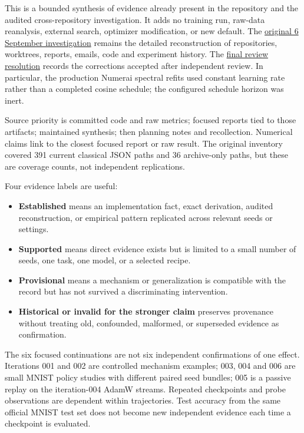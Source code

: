 \documentclass[
  british,
  10pt,
  a4paper,
]{article}
\providecommand{\tightlist}{%
  \setlength{\itemsep}{0pt}\setlength{\parskip}{0pt}}
\begin{document}
This is a bounded synthesis of evidence already present in the
repository and the audited cross-\allowbreak{}repository
investigatio\allowbreak{}n.\allowbreak{} It adds no training run,
raw-data reanalysis,\allowbreak{} external search, optimizer
modification\allowbreak{},\allowbreak{} or new default. The
\href{../../../research/spectral_optimizer_investigation_2026-09-06.md}{original
6 September investigation} remains the detailed reconstruction of
repositories\allowbreak{},\allowbreak{} worktrees, reports, emails, code
and experiment history. The \href{../audit/final-resolution.md}{final
review resolution} records the corrections accepted after independent
review. In particular,\allowbreak{} the production Numerai spectral
refits used constant learning rate rather than a completed cosine
schedule; the configured schedule horizon was inert.

Source priority is committed code and raw metrics; focused reports tied
to those artifacts; maintained synthesis; then planning notes and
recollection\allowbreak{}.\allowbreak{} Numerical claims link to the
closest focused report or raw result. The original inventory covered 391
current classical JSON paths and 36 archive-\allowbreak{}only paths, but
these are coverage counts, not independent
replications\allowbreak{}.\allowbreak{}

Four evidence labels are useful:

\begin{itemize}
\tightlist
\item
  \textbf{Established} means an implementation fact, exact
  derivation,\allowbreak{} audited
  reconstructi\allowbreak{}on,\allowbreak{} or empirical pattern
  replicated across relevant seeds or settings.
\item
  \textbf{Supported} means direct evidence exists but is limited to a
  small number of seeds, one task, one model, or a selected recipe.
\item
  \textbf{Provisional} means a mechanism or generalization is compatible
  with the record but has not survived a discriminating
  intervention\allowbreak{}.\allowbreak{}
\item
  \textbf{Historical or invalid for the stronger claim} preserves
  provenance without treating old, confounded,\allowbreak{} malformed,
  or superseded evidence as confirmation\allowbreak{}.\allowbreak{}
\end{itemize}

The six focused continuations are not six independent confirmations of
one effect. Iterations 001 and 002 are controlled mechanism examples;
003, 004 and 006 are small MNIST policy studies with different paired
seed bundles; 005 is a passive replay on the iteration-\allowbreak{}004
AdamW streams. Repeated checkpoints and probe observations are dependent
within trajectories\allowbreak{}.\allowbreak{} Test accuracy from the
same official MNIST test set does not become new independent evidence
each time a checkpoint is evaluated.
\end{document}
